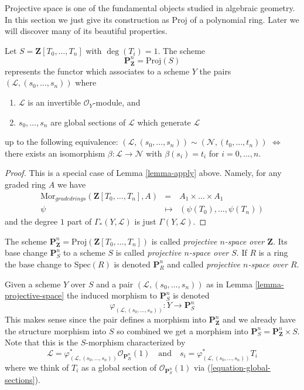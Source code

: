 \noindent
Projective space is one of the fundamental objects studied in
algebraic geometry. In this section we just give its construction
as $\text{Proj}$ of a polynomial ring. Later we will discover many
of its beautiful properties.

\begin{lemma}
\label{lemma-projective-space}
Let $S = \mathbf{Z}[T_0, \ldots, T_n]$ with $\deg(T_i) = 1$.
The scheme
$$
\mathbf{P}^n_{\mathbf{Z}} = \text{Proj}(S)
$$
represents the functor which associates to a scheme $Y$ the pairs
$(\mathcal{L}, (s_0, \ldots, s_n))$ where
\begin{enumerate}
\item $\mathcal{L}$ is an invertible $\mathcal{O}_Y$-module, and
\item $s_0, \ldots, s_n$ are global sections of $\mathcal{L}$
which generate $\mathcal{L}$
\end{enumerate}
up to the following equivalence:
$(\mathcal{L}, (s_0, \ldots, s_n)) \sim
(\mathcal{N}, (t_0, \ldots, t_n))$ $\Leftrightarrow$ there exists
an isomorphism $\beta : \mathcal{L} \to \mathcal{N}$
with $\beta(s_i) = t_i$ for $i = 0, \ldots, n$.
\end{lemma}

\begin{proof}
This is a special case of Lemma \ref{lemma-apply} above.
Namely, for any graded ring $A$ we have
\begin{eqnarray*}
\text{Mor}_{graded rings}(\mathbf{Z}[T_0, \ldots, T_n], A)
& = &
A_1 \times \ldots \times A_1 \\
\psi & \mapsto & (\psi(T_0), \ldots, \psi(T_n))
\end{eqnarray*}
and the degree $1$ part of $\Gamma_*(Y, \mathcal{L})$ is
just $\Gamma(Y, \mathcal{L})$.
\end{proof}

\begin{definition}
\label{definition-projective-space}
The scheme
$\mathbf{P}^n_{\mathbf{Z}} = \text{Proj}(\mathbf{Z}[T_0, \ldots, T_n])$
is called {\it projective $n$-space over $\mathbf{Z}$}.
Its base change $\mathbf{P}^n_S$ to a scheme $S$ is called
{\it projective $n$-space over $S$}. If $R$ is a ring the base change
to $\text{Spec}(R)$ is denoted $\mathbf{P}^n_R$ and called
{\it projective $n$-space over $R$}.
\end{definition}

\noindent
Given a scheme $Y$ over $S$
and a pair $(\mathcal{L}, (s_0, \ldots, s_n))$ as in
Lemma \ref{lemma-projective-space}
the induced morphism to $\mathbf{P}^n_S$ is denoted
$$
\varphi_{(\mathcal{L}, (s_0, \ldots, s_n))} :
Y \longrightarrow \mathbf{P}^n_S
$$
This makes sense since the pair defines a morphism into
$\mathbf{P}^n_{\mathbf{Z}}$ and we already have the structure
morphism into $S$ so combined we get a morphism into
$\mathbf{P}^n_S = \mathbf{P}^n_{\mathbf{Z}} \times S$.
Note that this is the $S$-morphism characterized by
$$
\mathcal{L} =
\varphi_{(\mathcal{L}, (s_0, \ldots, s_n))}^*\mathcal{O}_{\mathbf{P}^n_R}(1)
\quad
\text{and}
\quad
s_i = \varphi_{(\mathcal{L}, (s_0, \ldots, s_n))}^*T_i
$$
where we think of $T_i$ as a global section of
$\mathcal{O}_{\mathbf{P}^n_S}(1)$ via (\ref{equation-global-sections}).

